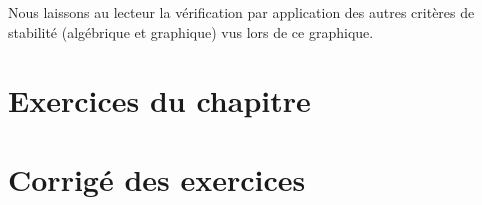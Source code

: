 Nous laissons au lecteur la vérification par application
des autres critères de stabilité (algébrique et graphique) vus lors de ce
graphique.

\clearpage
\restoregeometry
\captionsetup{width=0.9\linewidth}
\section{Exercices du chapitre}
\small

\setcounter{numexos}{0}
\normalsize
\newpage
\restoregeometry
\captionsetup{width=0.9\linewidth}
\section{Corrigé des exercices}
\small

\normalsize
\restoregeometry
\captionsetup{width=0.9\linewidth}
